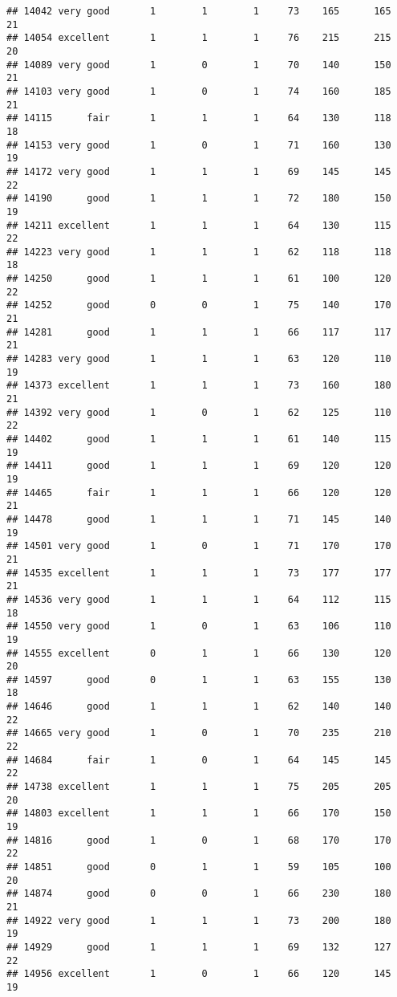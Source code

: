 \documentclass[]{article}
\begin{document}
\begin{verbatim}
## 14042 very good       1        1        1     73    165      165  21
## 14054 excellent       1        1        1     76    215      215  20
## 14089 very good       1        0        1     70    140      150  21
## 14103 very good       1        0        1     74    160      185  21
## 14115      fair       1        1        1     64    130      118  18
## 14153 very good       1        0        1     71    160      130  19
## 14172 very good       1        1        1     69    145      145  22
## 14190      good       1        1        1     72    180      150  19
## 14211 excellent       1        1        1     64    130      115  22
## 14223 very good       1        1        1     62    118      118  18
## 14250      good       1        1        1     61    100      120  22
## 14252      good       0        0        1     75    140      170  21
## 14281      good       1        1        1     66    117      117  21
## 14283 very good       1        1        1     63    120      110  19
## 14373 excellent       1        1        1     73    160      180  21
## 14392 very good       1        0        1     62    125      110  22
## 14402      good       1        1        1     61    140      115  19
## 14411      good       1        1        1     69    120      120  19
## 14465      fair       1        1        1     66    120      120  21
## 14478      good       1        1        1     71    145      140  19
## 14501 very good       1        0        1     71    170      170  21
## 14535 excellent       1        1        1     73    177      177  21
## 14536 very good       1        1        1     64    112      115  18
## 14550 very good       1        0        1     63    106      110  19
## 14555 excellent       0        1        1     66    130      120  20
## 14597      good       0        1        1     63    155      130  18
## 14646      good       1        1        1     62    140      140  22
## 14665 very good       1        0        1     70    235      210  22
## 14684      fair       1        0        1     64    145      145  22
## 14738 excellent       1        1        1     75    205      205  20
## 14803 excellent       1        1        1     66    170      150  19
## 14816      good       1        0        1     68    170      170  22
## 14851      good       0        1        1     59    105      100  20
## 14874      good       0        0        1     66    230      180  21
## 14922 very good       1        1        1     73    200      180  19
## 14929      good       1        1        1     69    132      127  22
## 14956 excellent       1        0        1     66    120      145  19

\end{verbatim}
\end{document}
